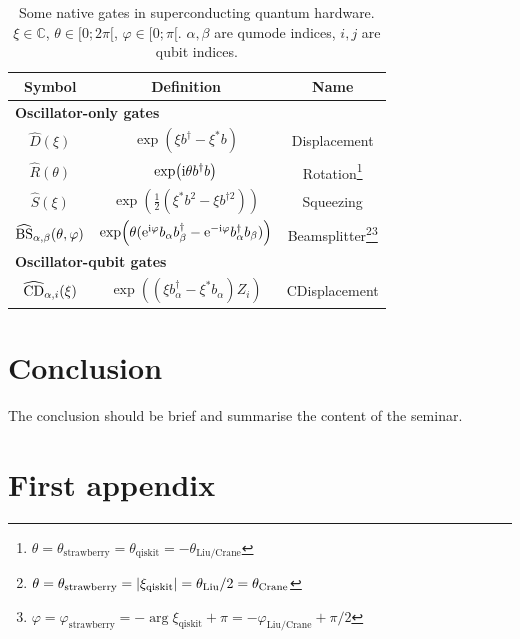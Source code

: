 \documentclass[
 reprint,
 preprintnumbers,
 nobibnotes,
 nofootinbib,
 longbibliography,
 amsmath,amssymb,
 aps,pra,
 onecolumn
]{revtex4-2}
\begin{document}
\begin{table}[ht]
\begin{ruledtabular}
    \centering
    \begin{tabular}{ccc}
        Symbol & Definition & Name \\ \hline
        \multicolumn{3}{l}{\bf Oscillator-only gates} \\ \hline
        $\hat{D} (\xi)$ & $\exp( \xi  b^\dag - \xi^\ast b )$ & Displacement \\
        $\hat{R} (\theta)$ & $\exp( {\rm i} \theta  b^\dag b )$ & Rotation\footnote{$\theta = \theta_\text{strawberry} = \theta_\text{qiskit} = -\theta_\text{Liu/Crane}$} \\
        $\hat{S} (\xi)$ & $\exp( \frac{1}{2} (\xi^\ast  b^2 - \xi b^{\dag2}) )$ & Squeezing \\
        $\widehat{\rm BS}_{\alpha,\beta} (\theta,\varphi)$ & $\exp( \theta ( {\rm e}^{{\rm i}\varphi} b_\alpha b_\beta^\dag - {\rm e}^{-{\rm i}\varphi} b_\alpha^\dag b_\beta) )$ & Beamsplitter\footnote{$\theta = \theta_\text{strawberry} = \abs{\xi_\text{qiskit}} = \theta_\text{Liu}/2 = \theta_\text{Crane}$}\footnote{$\varphi = \varphi_\text{strawberry} = - \arg{\xi_\text{qiskit}} + \pi = - \varphi_\text{Liu/Crane} + \pi/2$} \\ \hline
        \multicolumn{3}{l}{{\bf Oscillator-qubit gates}} \\ \hline
        $\widehat{\rm CD}_{\alpha,i} (\xi)$ & $\exp( (\xi  b_\alpha^\dag - \xi^\ast b_\alpha) Z_i )$ & CDisplacement
    \end{tabular}
    \caption{Some native gates in superconducting quantum hardware. $\xi\in\mathbb{C}$, $\theta\in [0;2\pi[$, $\varphi\in[0;\pi[$. $\alpha,\beta$ are qumode indices, $i,j$ are qubit indices.}
    \label{tab:gates}
\end{ruledtabular}
\end{table}


\section*{Conclusion}

The conclusion should be brief and summarise the content of the seminar.


\appendix


\section{First appendix}
\label{app:lorem_appendix}
\end{document}
